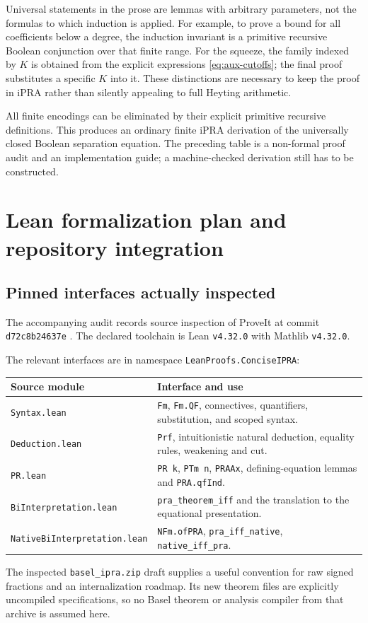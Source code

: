 \documentclass[11pt]{article}
\theoremstyle{definition}\newtheorem{definition}[theorem]{Definition}
\theoremstyle{remark}\newtheorem{remark}[theorem]{Remark}
\newcommand{\code}[1]{{\small\texttt{#1}}}
\begin{document}
Universal statements in the prose are lemmas with arbitrary parameters,
not the formulas to which induction is applied. For example, to prove a
bound for all coefficients below a degree, the induction invariant is a
primitive recursive Boolean conjunction over that finite range. For the
squeeze, the family indexed by $K$ is obtained from the explicit expressions
\eqref{eq:aux-cutoffs}; the final proof substitutes a specific $K$ into it.
These distinctions are necessary to keep the proof in iPRA rather than
silently appealing to full Heyting arithmetic.

All finite encodings can be eliminated by their explicit primitive recursive
definitions. This produces an ordinary finite iPRA derivation of the
universally closed Boolean separation equation. The preceding table is a
non-formal proof audit and an implementation guide; a machine-checked
derivation still has to be constructed.

\section{Lean formalization plan and repository integration}\label{sec:lean}
\subsection{Pinned interfaces actually inspected}
The accompanying audit records source inspection of ProveIt at commit
\texttt{d72c8b24637e} \cite{ProveIt}.
The declared toolchain is Lean \texttt{v4.32.0} with Mathlib
\texttt{v4.32.0}.

The relevant interfaces are in namespace \code{LeanProofs.ConciseIPRA}:
\begin{center}
\begin{tabular}{p{.36\linewidth}p{.55\linewidth}}
\toprule
Source module & Interface and use\\\midrule
\code{Syntax.lean} & \code{Fm}, \code{Fm.QF}, connectives, quantifiers,
substitution, and scoped syntax.\\
\code{Deduction.lean} & \code{Prf}, intuitionistic natural deduction,
equality rules, weakening and cut.\\
\code{PR.lean} & \code{PR k}, \code{PTm n}, \code{PRAAx}, defining-equation
lemmas and \code{PRA.qfInd}.\\
\code{BiInterpretation.lean} & \code{pra\_theorem\_iff} and the
translation to the equational presentation.\\
\code{NativeBiInterpretation.lean} & \code{NFm.ofPRA},
\code{pra\_iff\_native}, \code{native\_iff\_pra}.\\
\bottomrule
\end{tabular}
\end{center}
The inspected \code{basel\_ipra.zip} draft supplies a useful convention for
raw signed fractions and an internalization roadmap. Its new theorem files
are explicitly uncompiled specifications, so no Basel theorem or analysis
compiler from that archive is assumed here.
\end{document}
